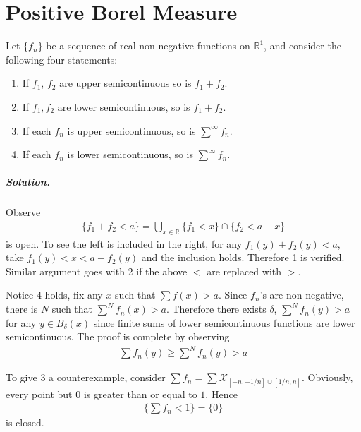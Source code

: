 \documentclass[../main.tex]{subfiles}
\begin{document}
 \chapter{Positive Borel Measure}
 \begin{exercise}
   Let $ \{f_n\} $ be a sequence of real non-negative functions on $ \mathbb R^{1} $, and consider the following
   four statements:
   \begin{enumerate}
     \item If $ f_1 $, $ f_2 $ are upper semicontinuous so is $ f_1 + f_2 $.
     \item If $ f_1, f_2 $ are lower semicontinuous, so is $ f_1 + f_2 $.
     \item If each $ f_n $ is upper semicontinuous, so is $ \sum^{\infty} f_n $.
     \item If each $ f_n $ is lower semicontinuous, so is $ \sum^{\infty} f_n $.
   \end{enumerate}
   \paragraph{Solution. }  Observe
   \begin{align*}
   \{f_1 + f_2 < a\} = \bigcup_{x \in \mathbb R} \{f_1 < x\} \cap \{f_2 < a - x\}
   \end{align*}
   is open. To see the left is included in the right, for any $ f_1(y) + f_2(y) < a $, take $ f_1(y) < x < a - f_2(y) $ and the
   inclusion holds. Therefore 1 is verified. Similar argument goes with 2 if the above $ < $ are replaced with $ > $.

   Notice 4 holds, fix any $ x $ such that $ \sum f(x) > a $. Since $ f_n $'s are non-negative, there is $ N $ such that
   $ \sum^{N} f_n(x) > a $. Therefore there exists $\delta$, $ \sum^N f_n(y) > a $ for any $ y \in B_\delta(x) $ since
   finite sums of lower semicontinuous functions are lower semicontinuous. The proof is complete by observing
   \begin{align*}
   \sum f_n(y) \ge \sum^N f_n(y) > a
   \end{align*}

   To give 3 a counterexample, consider $ \sum f_n = \sum \mathcal X_{[-n, -1/n] \cup [1/n, n]} $.
   Obviously, every point but $ 0 $ is greater than or equal to $ 1 $. Hence
   \begin{align*}
   \{\sum f_n < 1 \} = \{0\}
   \end{align*}
   is closed.
 \end{exercise}
\end{document}
